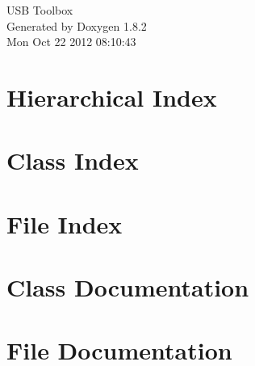 \documentclass{book}
\begin{document}
\hypersetup{pageanchor=false,citecolor=blue}
\begin{titlepage}
\vspace*{7cm}
\begin{center}
{\Large U\-S\-B Toolbox }\\
\vspace*{1cm}
{\large Generated by Doxygen 1.8.2}\\
\vspace*{0.5cm}
{\small Mon Oct 22 2012 08:10:43}\\
\end{center}
\end{titlepage}
\clearemptydoublepage
{}
\tableofcontents
\clearemptydoublepage
{}
\hypersetup{pageanchor=true,citecolor=blue}
\chapter{Hierarchical Index}

\chapter{Class Index}

\chapter{File Index}

\chapter{Class Documentation}





\chapter{File Documentation}











\printindex
\end{document}
